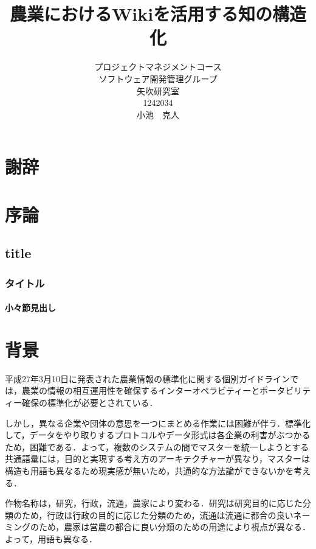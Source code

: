 \title{農業におけるWikiを活用する知の構造化}
\author{プロジェクトマネジメントコース\\
ソフトウェア開発管理グループ\\
矢吹研究室\\
1242034\\
小池　克人}
\date{}


\maketitle


 \chapter*{謝辞}

\tableofcontents%

 \chapter{序論}
\section{title}
\subsection{タイトル}
\subsubsection{小々節見出し}


 \chapter{背景}
平成27年3月10日に発表された農業情報の標準化に関する個別ガイドラインでは，農業の情報の相互運用性を確保するインターオペラビティーとポータビリティー確保の標準化が必要とされている\cite{naikaku2014}．

しかし，異なる企業や団体の意思を一つにまとめる作業には困難が伴う．標準化して，データをやり取りするプロトコルやデータ形式は各企業の利害がぶつかるため，困難である\cite{kizi2015}．よって，複数のシステムの間でマスターを統一しようとする共通語彙には，目的と実現する考え方のアーキテクチャーが異なり，マスターは構造も用語も異なるため現実感が無いため，共通的な方法論ができないかを考える．

作物名称は，研究，行政，流通，農家により変わる．研究は研究目的に応じた分類のため，行政は行政の目的に応じた分類のため，流通は流通に都合の良いネーミングのため，農家は営農の都合に良い分類のための用途により視点が異なる．よって，用語も異なる．

